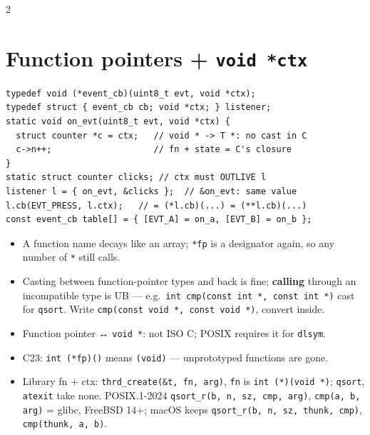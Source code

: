 \documentclass[8pt]{extarticle}
\newcommand\ct[1]{\texttt{#1}}
\begin{document}
\begin{multicols}{2}
\section{Function pointers + \texttt{void *ctx}}
\begin{lstlisting}[style=CSheet]
typedef void (*event_cb)(uint8_t evt, void *ctx);
typedef struct { event_cb cb; void *ctx; } listener;
static void on_evt(uint8_t evt, void *ctx) {
  struct counter *c = ctx;   // void * -> T *: no cast in C
  c->n++;                    // fn + state = C's closure
}
static struct counter clicks; // ctx must OUTLIVE l
listener l = { on_evt, &clicks };  // &on_evt: same value
l.cb(EVT_PRESS, l.ctx);   // = (*l.cb)(...) = (**l.cb)(...)
const event_cb table[] = { [EVT_A] = on_a, [EVT_B] = on_b };
\end{lstlisting}
\begin{itemize}
  \item A function name decays like an array; \ct{*fp} is a designator again, so any number
        of \ct{*} still calls.
  \item Casting between function-pointer types and back is fine; \textbf{calling} through an
        incompatible type is UB — e.g.\ \ct{int cmp(const int *, const int *)} cast for
        \ct{qsort}. Write \ct{cmp(const void *, const void *)}, convert inside.
  \item Function pointer ↔ \ct{void *}: not ISO C; POSIX requires it for \ct{dlsym}.
  \item C23: \ct{int (*fp)()} means \ct{(void)} — unprototyped functions are gone.
  \item Library fn + ctx: \ct{thrd\_create(\&t, fn, arg)}, \ct{fn} is \ct{int (*)(void *)};
        \ct{qsort}, \ct{atexit} take none. POSIX.1-2024 \ct{qsort\_r(b, n, sz, cmp, arg)},
        \ct{cmp(a, b, arg)} = glibc, FreeBSD 14+; macOS keeps \ct{qsort\_r(b, n, sz, thunk,
        cmp)}, \ct{cmp(thunk, a, b)}.
\end{itemize}


\end{multicols}
\end{document}
